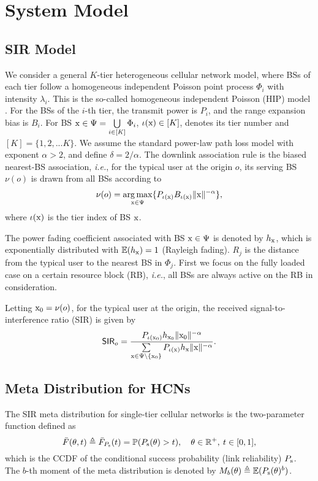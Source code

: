 \documentclass[12pt,draftclsnofoot,journal,onecolumn]{IEEEtran}
\def\E{\mathbb{E}}
\def\P{\mathbb{P}}
\def\R{\mathbb{R}}
\def\ie{{\em i.e.}}
\def\SIR{\mathsf{SIR}}
\def\Ps{P_{\rm s}}
\begin{document}
\section{System Model}\label{sec:SystemModel}
\subsection{SIR Model}
We consider a general $K$-tier heterogeneous cellular network model, where BSs of each tier follow a homogeneous independent Poisson point process $\Phi_i$ with intensity $\lambda_i$. This is the so-called homogeneous independent Poisson (HIP) model \cite[Def.~2]{Haenggi14wcl}. For the BSs of the $i$-th tier, the transmit power is $P_i$, and the range expansion bias is $B_i$. For BS ${\rm x}\in \Psi=\bigcup\limits_{i\in[K]}\Phi_i$, $\iota({\rm x})\in[K]$, denotes its tier number and $[K]=\{1,2,...K\}$. We assume the standard power-law path loss model with exponent $\alpha>2$, and define $\delta = 2/\alpha$. The downlink association rule is the biased nearest-BS association, \ie, for the typical user at the origin $o$, its serving BS $\nu(o)$ is drawn from all BSs according to 
\begin{equation}\label{eq:nu_o}
\nu(o)= \mathop{\arg\max}\limits_{{\rm x}\in\Psi}\{P_{\iota({\rm x})}B_{\iota({\rm x})}\|{\rm x}\|^{-\alpha}\},
\end{equation}  
where $\iota({\rm x})$ is the tier index of BS $\rm x$.

The power fading coefficient associated with BS ${\rm x}\in\Psi$ is denoted by $h_{\rm x}$, which is exponentially distributed with $\E(h_{\rm x})=1$ (Rayleigh fading). $R_j$ is the distance from the typical user to the nearest BS in $\Phi_j$. First we focus on the fully loaded case on a certain resource block (RB), \ie, all BSs are always active on the RB in consideration.

Letting ${\rm x_0} = \nu(o)$, for the typical user at the origin, the received signal-to-interference ratio (SIR) is given by
\begin{equation}\label{eq:SIR_typ}
\SIR_o = \frac{P_{\iota({\rm x_0})}h_{\rm x_0}\|\rm x_0\|^{-\alpha}}{\sum\limits_{{\rm x}\in\Psi\setminus\{\rm x_0\}}P_{\iota({\rm x})}h_{\rm x}\|{\rm x}\|^{-\alpha}}.
\end{equation}

\subsection{Meta Distribution for HCNs}
The SIR meta distribution for single-tier cellular networks is the two-parameter function defined as \cite{MHmeta}
\begin{equation}
\bar F(\theta, t) \triangleq \bar F_{\Ps}(t) = \P(\Ps(\theta)>t),\quad \theta\in\R^+,\:t\in [0,1],
\label{eq:meta}
\end{equation}
which is the CCDF of the conditional success probability (link reliability) $\Ps$. The $b$-th moment of the meta distribution is denoted by $M_b(\theta)\triangleq \E(\Ps(\theta)^b)$.
\end{document}
